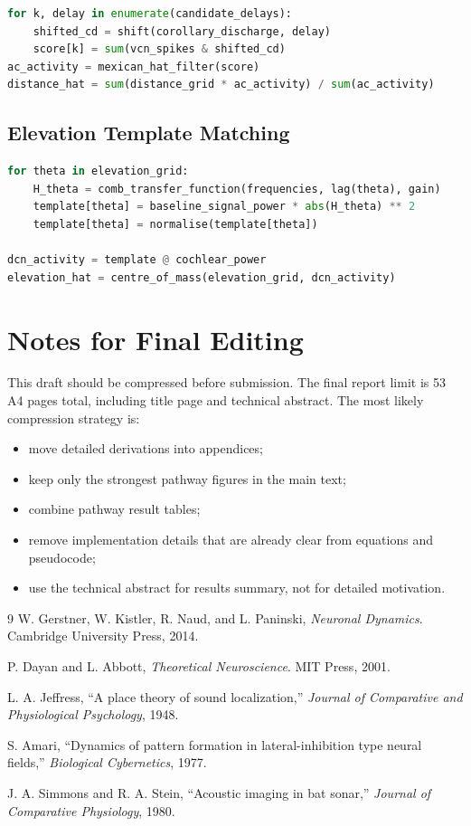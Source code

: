 \documentclass[12pt,a4paper]{report}
\begin{document}
\begin{lstlisting}[language=Python,caption={Delay-line coincidence scoring.}]
for k, delay in enumerate(candidate_delays):
    shifted_cd = shift(corollary_discharge, delay)
    score[k] = sum(vcn_spikes & shifted_cd)
ac_activity = mexican_hat_filter(score)
distance_hat = sum(distance_grid * ac_activity) / sum(ac_activity)
\end{lstlisting}

\section{Elevation Template Matching}

\begin{lstlisting}[language=Python,caption={Signal-weighted DCN elevation template.}]
for theta in elevation_grid:
    H_theta = comb_transfer_function(frequencies, lag(theta), gain)
    template[theta] = baseline_signal_power * abs(H_theta) ** 2
    template[theta] = normalise(template[theta])

dcn_activity = template @ cochlear_power
elevation_hat = centre_of_mass(elevation_grid, dcn_activity)
\end{lstlisting}

\chapter{Notes for Final Editing}

This draft should be compressed before submission. The final report limit is 53 A4 pages total, including title page and technical abstract. The most likely compression strategy is:
\begin{itemize}
  \item move detailed derivations into appendices;
  \item keep only the strongest pathway figures in the main text;
  \item combine pathway result tables;
  \item remove implementation details that are already clear from equations and pseudocode;
  \item use the technical abstract for results summary, not for detailed motivation.
\end{itemize}

\begin{thebibliography}{9}
W. Gerstner, W. Kistler, R. Naud, and L. Paninski, \textit{Neuronal Dynamics}. Cambridge University Press, 2014.

P. Dayan and L. Abbott, \textit{Theoretical Neuroscience}. MIT Press, 2001.

L. A. Jeffress, ``A place theory of sound localization,'' \textit{Journal of Comparative and Physiological Psychology}, 1948.

S. Amari, ``Dynamics of pattern formation in lateral-inhibition type neural fields,'' \textit{Biological Cybernetics}, 1977.

J. A. Simmons and R. A. Stein, ``Acoustic imaging in bat sonar,'' \textit{Journal of Comparative Physiology}, 1980.
\end{thebibliography}
\end{document}
